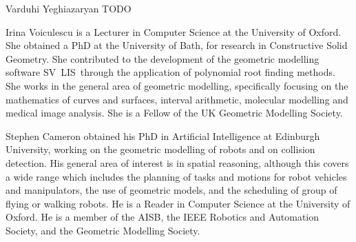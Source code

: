 \documentclass[10pt,twocolumn,twoside]{IEEEtran}
\newcommand{\svlis}{%
\mbox{\scriptsize S\hspace{-0.2mm}\footnotesize V\hspace{-0.2mm}%
\normalsize L\hspace{0.1mm}\footnotesize I\hspace{0.2mm}\scriptsize S\ }}
\begin{document}
\begin{IEEEbiography}[]{Varduhi Yeghiazaryan}
TODO
\end{IEEEbiography}

\begin{IEEEbiography}{Irina Voiculescu}
is a Lecturer in Computer Science at the University of Oxford. She obtained a PhD at the University of Bath, for research in Constructive Solid Geometry. She contributed to the development of the geometric modelling software \svlis through the application of polynomial root finding methods. She works in the general area of geometric modelling, specifically focusing on the mathematics of curves and surfaces, interval arithmetic, molecular modelling and medical image analysis. She is a Fellow of the UK Geometric Modelling Society.
\end{IEEEbiography}

\begin{IEEEbiography}{Stephen Cameron}
obtained his PhD in Artificial Intelligence at Edinburgh University, working on the geometric modelling of robots and on collision detection. His general area of interest is in spatial reasoning, although this covers a wide range which includes the planning of tasks and motions for robot vehicles and manipulators, the use of geometric models, and the scheduling of group of flying or walking robots. He is a Reader in Computer Science at the University of Oxford. He is a member of the AISB, the IEEE Robotics and Automation Society, and the Geometric Modelling Society.
\end{IEEEbiography}
\end{document}
